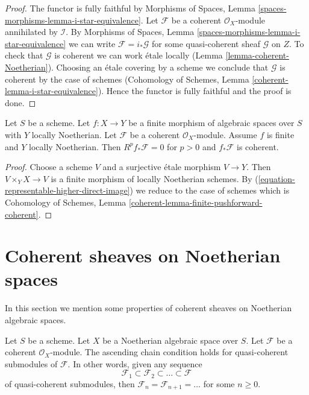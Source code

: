 \begin{proof}
The functor is fully faithful by
Morphisms of Spaces, Lemma \ref{spaces-morphisms-lemma-i-star-equivalence}.
Let $\mathcal{F}$ be a coherent $\mathcal{O}_X$-module
annihilated by $\mathcal{I}$. By
Morphisms of Spaces, Lemma \ref{spaces-morphisms-lemma-i-star-equivalence}
we can write $\mathcal{F} = i_*\mathcal{G}$ for some quasi-coherent
sheaf $\mathcal{G}$ on $Z$. To check that $\mathcal{G}$ is coherent
we can work \'etale locally (Lemma \ref{lemma-coherent-Noetherian}).
Choosing an \'etale covering by a scheme we conclude that
$\mathcal{G}$ is coherent by the case of schemes
(Cohomology of Schemes, Lemma \ref{coherent-lemma-i-star-equivalence}).
Hence the functor is fully faithful and the proof is done.
\end{proof}

\begin{lemma}
\label{lemma-finite-pushforward-coherent}
Let $S$ be a scheme. Let $f : X \to Y$ be a finite morphism of algebraic
spaces over $S$ with $Y$ locally Noetherian. Let $\mathcal{F}$ be a
coherent $\mathcal{O}_X$-module. Assume $f$ is finite and $Y$ locally
Noetherian. Then $R^pf_*\mathcal{F} = 0$ for $p > 0$ and
$f_*\mathcal{F}$ is coherent.
\end{lemma}

\begin{proof}
Choose a scheme $V$ and a surjective \'etale morphism $V \to Y$.
Then $V \times_Y X \to V$ is a finite morphism of locally Noetherian
schemes. By (\ref{equation-representable-higher-direct-image}) we reduce
to the case of schemes which is
Cohomology of Schemes, Lemma \ref{coherent-lemma-finite-pushforward-coherent}.
\end{proof}






\section{Coherent sheaves on Noetherian spaces}
\label{section-coherent-quasi-compact}

\noindent
In this section we mention some properties of coherent sheaves on
Noetherian algebraic spaces.

\begin{lemma}
\label{lemma-acc-coherent}
Let $S$ be a scheme. Let $X$ be a Noetherian algebraic space over $S$.
Let $\mathcal{F}$ be a coherent $\mathcal{O}_X$-module.
The ascending chain condition holds for quasi-coherent submodules
of $\mathcal{F}$. In other words, given any sequence
$$
\mathcal{F}_1 \subset \mathcal{F}_2 \subset \ldots \subset \mathcal{F}
$$
of quasi-coherent submodules, then
$\mathcal{F}_n = \mathcal{F}_{n + 1} = \ldots $ for some $n \geq 0$.
\end{lemma}

